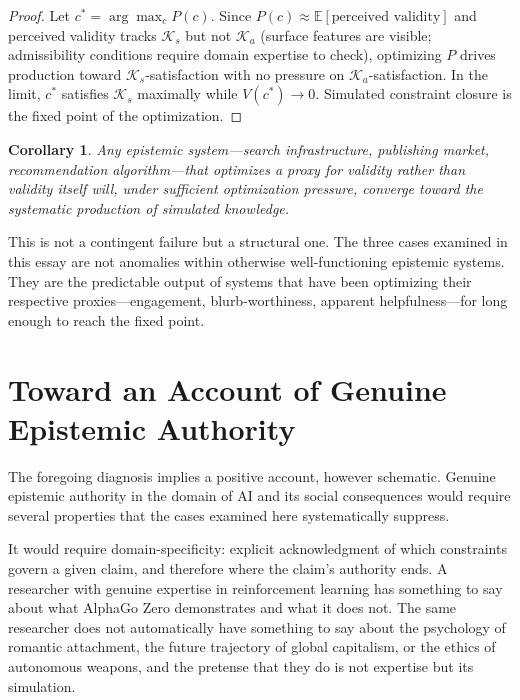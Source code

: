 \documentclass[12pt, a4paper]{article}
\newtheorem{corollary}[definition]{Corollary}
\begin{document}
\begin{proof}
Let $c^* = \arg\max_c P(c)$. Since $P(c) \approx \mathbb{E}[\text{perceived validity}]$ and
perceived validity tracks $\mathcal{K}_s$ but not $\mathcal{K}_a$ (surface features are visible;
admissibility conditions require domain expertise to check), optimizing $P$ drives production
toward $\mathcal{K}_s$-satisfaction with no pressure on $\mathcal{K}_a$-satisfaction. In the
limit, $c^*$ satisfies $\mathcal{K}_s$ maximally while $V(c^*) \to 0$. Simulated constraint
closure is the fixed point of the optimization.
\end{proof}

\begin{corollary}
Any epistemic system---search infrastructure, publishing market, recommendation algorithm---that
optimizes a proxy for validity rather than validity itself will, under sufficient optimization
pressure, converge toward the systematic production of simulated knowledge.
\end{corollary}

This is not a contingent failure but a structural one. The three cases examined in this essay are
not anomalies within otherwise well-functioning epistemic systems. They are the predictable output
of systems that have been optimizing their respective proxies---engagement, blurb-worthiness,
apparent helpfulness---for long enough to reach the fixed point.

\section{Toward an Account of Genuine Epistemic Authority}

The foregoing diagnosis implies a positive account, however schematic. Genuine epistemic authority
in the domain of AI and its social consequences would require several properties that the cases
examined here systematically suppress.

It would require domain-specificity: explicit acknowledgment of which constraints govern a given
claim, and therefore where the claim's authority ends. A researcher with genuine expertise in
reinforcement learning has something to say about what AlphaGo Zero demonstrates and what it does
not. The same researcher does not automatically have something to say about the psychology of
romantic attachment, the future trajectory of global capitalism, or the ethics of autonomous
weapons, and the pretense that they do is not expertise but its simulation.
\end{document}
